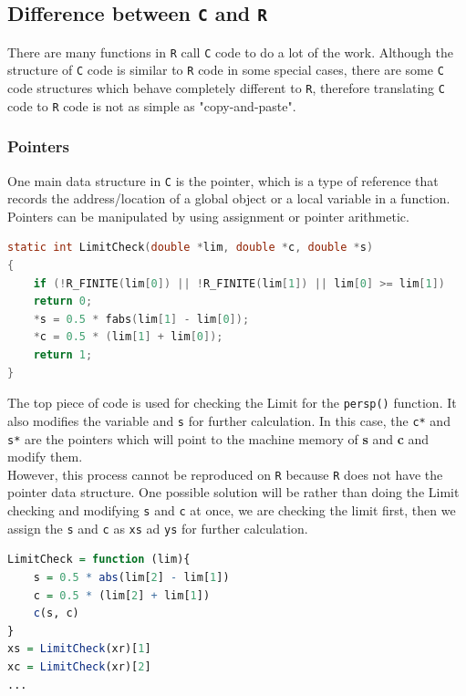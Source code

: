 \documentclass[11pt,twoside]{report}
\begin{document}
\newpage
\subsection{Difference between \texttt{C} and \texttt{R}}
There are many functions in \texttt{R} call \texttt{C} code to do a lot of the work. Although the structure of \texttt{C} code is similar to \texttt{R} code in some special cases, there are some \texttt{C} code structures which behave completely different to \texttt{R}, therefore translating \texttt{C} code to \texttt{R} code is not as simple as "copy-and-paste".\\

\subsubsection{Pointers}
One main data structure in \texttt{C} is the pointer, which is a type of reference that records the address/location of a global object or a local variable in a function. Pointers can be manipulated by using assignment or pointer arithmetic.
\begin{lstlisting}[language = C]
static int LimitCheck(double *lim, double *c, double *s)
{
    if (!R_FINITE(lim[0]) || !R_FINITE(lim[1]) || lim[0] >= lim[1])
    return 0;
    *s = 0.5 * fabs(lim[1] - lim[0]);
    *c = 0.5 * (lim[1] + lim[0]);
    return 1;
}
\end{lstlisting}

The top piece of code is used for checking the Limit for the \texttt{persp()} function. It also modifies the variable  and \texttt{s} for further calculation. In this case, the \texttt{c*} and \texttt{s*} are the pointers which will point to the machine memory of \textbf{s} and \textbf{c} and modify them.\\

However, this process cannot be reproduced on \texttt{R} because \texttt{R} does not have the pointer data structure. One possible solution will be rather than doing the Limit checking and modifying \texttt{s} and \texttt{c} at once, we are checking the limit first, then we assign the \texttt{s} and \texttt{c} as \texttt{xs} ad \texttt{ys} for further calculation.
\begin{lstlisting}[language = R]
LimitCheck = function (lim){
    s = 0.5 * abs(lim[2] - lim[1])
    c = 0.5 * (lim[2] + lim[1])
    c(s, c)
}
xs = LimitCheck(xr)[1]
xc = LimitCheck(xr)[2]
...
\end{lstlisting}
\end{document}
